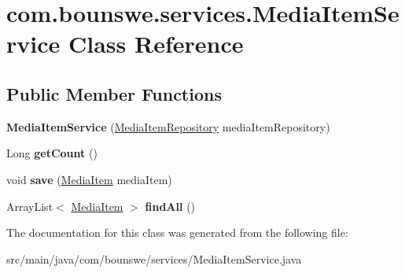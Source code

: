 \hypertarget{classcom_1_1bounswe_1_1services_1_1_media_item_service}{}\section{com.\+bounswe.\+services.\+Media\+Item\+Service Class Reference}
\label{classcom_1_1bounswe_1_1services_1_1_media_item_service}
\subsection*{Public Member Functions}
\begin{DoxyCompactItemize}
\item 
\mbox{\label{classcom_1_1bounswe_1_1services_1_1_media_item_service_ae308dc659369c3f10192481b98f9310e}} 
{\bfseries Media\+Item\+Service} (\hyperlink{interfacecom_1_1bounswe_1_1repository_1_1_media_item_repository}{Media\+Item\+Repository} media\+Item\+Repository)
\item 
\mbox{\label{classcom_1_1bounswe_1_1services_1_1_media_item_service_a5bd171491671225368bc6479d7a434e3}} 
Long {\bfseries get\+Count} ()
\item 
\mbox{\label{classcom_1_1bounswe_1_1services_1_1_media_item_service_a0f294e1bca95d36e31add044688106d3}} 
void {\bfseries save} (\hyperlink{classcom_1_1bounswe_1_1models_1_1_media_item}{Media\+Item} media\+Item)
\item 
\mbox{\label{classcom_1_1bounswe_1_1services_1_1_media_item_service_a906b7a0a40afbc3962cc0e8cf587e2bb}} 
Array\+List$<$ \hyperlink{classcom_1_1bounswe_1_1models_1_1_media_item}{Media\+Item} $>$ {\bfseries find\+All} ()
\end{DoxyCompactItemize}


The documentation for this class was generated from the following file\+:\begin{DoxyCompactItemize}
\item 
src/main/java/com/bounswe/services/Media\+Item\+Service.\+java\end{DoxyCompactItemize}
